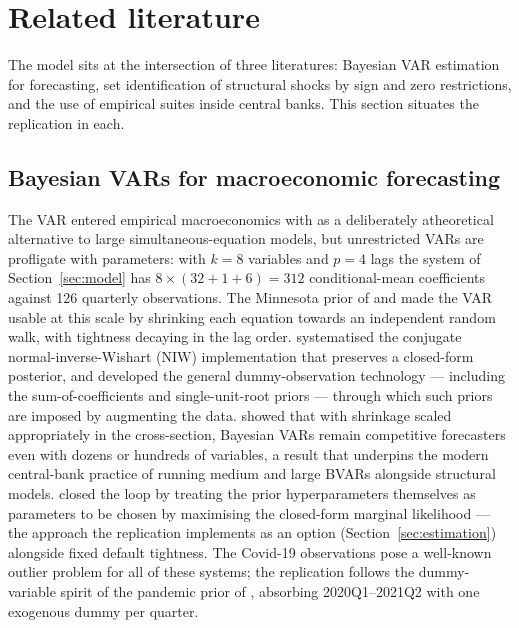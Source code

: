 \section{Related literature}
\label{sec:literature}

The model sits at the intersection of three literatures: Bayesian VAR estimation for forecasting, set identification of structural shocks by sign and zero restrictions, and the use of empirical suites inside central banks. This section situates the replication in each.

\subsection{Bayesian VARs for macroeconomic forecasting}

The VAR entered empirical macroeconomics with \citet{sims1980} as a deliberately atheoretical alternative to large simultaneous-equation models, but unrestricted VARs are profligate with parameters: with $k=8$ variables and $p=4$ lags the system of Section~\ref{sec:model} has $8\times(32+1+6)=312$ conditional-mean coefficients against 126 quarterly observations. The Minnesota prior of \citet{doan1984} and \citet{litterman1986} made the VAR usable at this scale by shrinking each equation towards an independent random walk, with tightness decaying in the lag order. \citet{kadiyala1997} systematised the conjugate normal-inverse-Wishart (NIW) implementation that preserves a closed-form posterior, and \citet{sims1998} developed the general dummy-observation technology --- including the sum-of-coefficients and single-unit-root priors --- through which such priors are imposed by augmenting the data. \citet{banbura2010} showed that with shrinkage scaled appropriately in the cross-section, Bayesian VARs remain competitive forecasters even with dozens or hundreds of variables, a result that underpins the modern central-bank practice of running medium and large BVARs alongside structural models. \citet{giannone2015} closed the loop by treating the prior hyperparameters themselves as parameters to be chosen by maximising the closed-form marginal likelihood --- the approach the replication implements as an option (Section~\ref{sec:estimation}) alongside fixed default tightness. The Covid-19 observations pose a well-known outlier problem for all of these systems; the replication follows the dummy-variable spirit of the pandemic prior of \citet{cascaldigarcia2022}, absorbing 2020Q1--2021Q2 with one exogenous dummy per quarter.

